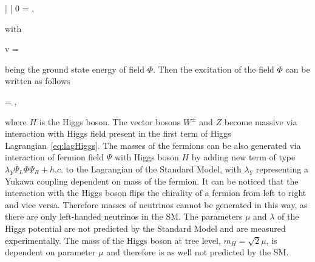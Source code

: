 {
     | \Phi | 0 \rangle =  ,
}

with

{
v = 
}

being the ground state energy of field $\Phi$. Then the excitation of the field $\Phi$ can be written as follows

{
    \Phi = ,
}

where $H$ is the Higgs boson. The vector bosons $W^{\pm}$ and $Z$ become massive via interaction with Higgs field present in the first term of Higgs Lagrangian~\ref{eq:lagHiggs}. The masses of the fermions can be also generated via interaction of fermion field  $\Psi$ with Higgs boson $H$ by adding new term of type $\lambda_{Y} \bar{\Psi}_{L} \Phi \Psi_{R} + h.c.$ to the Lagrangian of the Standard Model, with $\lambda_{Y}$ representing a Yukawa coupling dependent on mass of the fermion. It can be noticed that the interaction with the Higgs boson flips the chirality of a fermion from left to right and vice versa. Therefore masses of neutrinos cannot be generated in this way, as there are only left-handed neutrinos in the SM. The parameters $\mu$ and $\lambda$ of the Higgs potential are not predicted by the Standard Model and are measured experimentally. The mass of the Higgs boson at tree level, $m_{H} = \sqrt{2}\mu$, is dependent on parameter $\mu$ and therefore is as well not predicted by the SM. 


